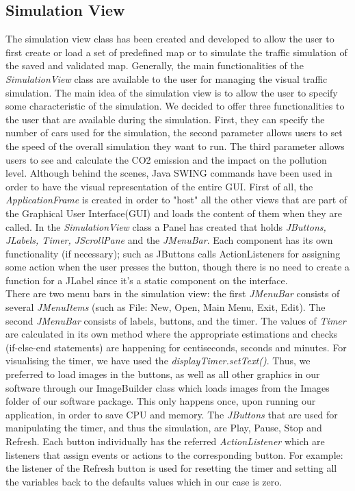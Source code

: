 \documentclass[oneside]{article}
\begin{document}
\subsection{Simulation View}
\noindent The simulation view class has been created and developed to allow the user to first create or load a set of predefined map or to simulate the traffic simulation of the saved and validated map. Generally, the main functionalities of the \textit{SimulationView} class are available to the user for managing the visual traffic simulation. The main idea of the simulation view is to allow the user to specify some characteristic of the simulation. We decided to offer three functionalities to the user that are available during the simulation. First, they can specify the number of cars used for the simulation, the second parameter allows users to set the speed of the overall simulation they want to run. The third parameter allows users to see and calculate the CO2 emission and the impact on the pollution level. Although behind the scenes, Java SWING commands have been used in order to have the visual representation of the entire GUI. First of all, the \textit{ApplicationFrame} is created in order to "host" all the other views that are part of the Graphical User Interface(GUI) and loads the content of them when they are called. In the \textit{SimulationView} class a Panel has created that holds \textit{JButtons, JLabels, Timer, JScrollPane} and the \textit{JMenuBar}. Each component has its own functionality (if necessary); such as JButtons calls ActionListeners for assigning some action when the user presses the button, though there is no need to create a function for a JLabel since it's a static component on the interface.\\

\noindent There are two menu bars in the simulation view: the first \textit{JMenuBar} consists of several \textit{JMenuItems} (such as File: New, Open, Main Menu, Exit, Edit). The second \textit{JMenuBar} consists of labels, buttons, and the timer. The values of \textit{Timer} are calculated in its own method where the appropriate estimations and checks (if-else-end statements) are happening for centiseconds, seconds and minutes. For visualising the timer, we have used the \textit{displayTimer.setText()}. Thus, we preferred to load images in the buttons, as well as all other graphics in our software through our ImageBuilder class which loads images from the Images folder of our software package. This only happens once, upon running our application, in order to save CPU and memory. The \textit{JButtons} that are used for manipulating the timer, and thus the simulation, are Play, Pause, Stop and Refresh. Each button individually has the referred \textit{ActionListener} which are listeners that assign events or actions to the corresponding button. For example: the listener of the Refresh button is used for resetting the timer and setting all the variables back to the defaults values which in our case is zero. 
\end{document}
